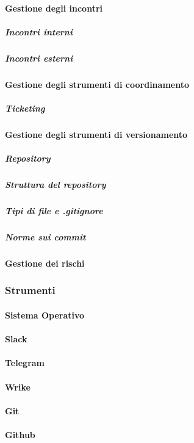 		\paragraph{Gestione degli incontri}
			\subparagraph{Incontri interni}
			\subparagraph{Incontri esterni}
		\paragraph{Gestione degli strumenti di coordinamento}
			\subparagraph{Ticketing}
		\paragraph{Gestione degli strumenti di versionamento}
			\subparagraph{Repository}
			\subparagraph{Struttura del repository}
			\subparagraph{Tipi di file e .gitignore}
			\subparagraph{Norme sui commit}
		\paragraph{Gestione dei rischi}
	\subsubsection{Strumenti}
		\paragraph{Sistema Operativo}
		\paragraph{Slack}
		\paragraph{Telegram}
		\paragraph{Wrike}
		\paragraph{Git}
		\paragraph{Github}
